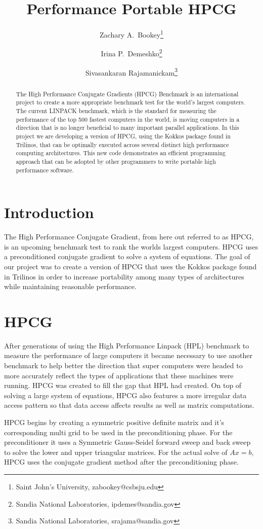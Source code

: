 \documentclass{ccr15}
\title{Performance Portable HPCG}
\author{Zachary A.\ Bookey\thanks{Saint John's University, zabookey@csbsju.edu} \and Irina P.\ Demeshko\thanks{Sandia National Laboratories,
ipdemes@sandia.gov} \and Sivasankaran Rajamanickam\thanks{Sandia National Laboratories, srajama@sandia.gov}}
\begin{document}
\maketitle

\begin{abstract}
The High Performance Conjugate Gradients (HPCG) Benchmark is an international project to create a
more appropriate benchmark test for the world's largest computers. The current LINPACK benchmark,
which is the standard for measuring the performance of the top 500 fastest computers in the
world, is moving computers in a direction that is no longer beneficial to many important
parallel applications. In this project we are developing a version of HPCG, using the Kokkos
package found in Trilinos, that can be optimally executed across several distinct high
performance computing architectures. This new code demonstrates an efficient programming 
approach that can be adopted by other programmers to write portable high performance software.
\end{abstract}

\section{Introduction}
The High Performance Conjugate Gradient, from here out referred to as HPCG, is an upcoming 
benchmark test to rank the worlds largest computers. HPCG uses a preconditioned 
conjugate gradient to solve a system of equations. The goal of our project was to create a
version of HPCG that uses the Kokkos package found in Trilinos in order to increase portability
among many types of architectures while maintaining reasonable performance.

\section{HPCG}
After generations of using the High Performance Linpack (HPL) benchmark to measure the
performance of large computers it became necessary to use another benchmark to help better the 
direction that super computers were headed to more accurately reflect the types of applications
that these machines were running. HPCG was created to fill the gap that HPL had created. On top
of solving a large system of equations, HPCG also features a more irregular data access pattern
so that data access affects results as well as matrix computations.

HPCG begins by creating a symmetric positive definite matrix and it's corresponding multi grid 
to be used in the preconditioning phase. For the preconditioner it uses a Symmetric Gauss-Seidel 
forward sweep and back sweep to solve the lower and upper triangular matrices. For the actual
solve of $A x = b$, HPCG uses the conjugate gradient method after the preconditioning phase.
\end{document}
